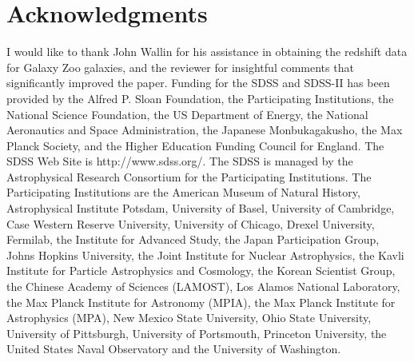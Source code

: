 \documentclass[times,twocolumn]{article}
\begin{document}
\section{Acknowledgments}
I would like to thank John Wallin for his assistance in obtaining the redshift data for Galaxy Zoo galaxies, and the  reviewer for insightful comments that significantly improved the paper. Funding for the SDSS and SDSS-II has been provided by the Alfred P. Sloan Foundation, the Participating Institutions, the National Science Foundation, the US Department of Energy, the National Aeronautics and Space Administration, the Japanese Monbukagakusho, the Max Planck Society, and the Higher Education Funding Council for England. The SDSS Web Site is http://www.sdss.org/. The SDSS is managed by the Astrophysical Research Consortium for the Participating Institutions. The Participating Institutions are the American Museum of Natural History, Astrophysical Institute Potsdam, University of Basel, University of Cambridge, Case Western Reserve University, University of Chicago, Drexel University, Fermilab, the Institute for Advanced Study, the Japan Participation Group, Johns Hopkins University, the Joint Institute for Nuclear Astrophysics, the Kavli Institute for Particle Astrophysics and Cosmology, the Korean Scientist Group, the Chinese Academy of Sciences (LAMOST), Los Alamos National Laboratory, the Max Planck Institute for Astronomy (MPIA), the Max Planck Institute for Astrophysics (MPA), New Mexico State University, Ohio State University, University of Pittsburgh, University of Portsmouth, Princeton University, the United States Naval Observatory and the University of Washington.





% 
% 

\end{document}
